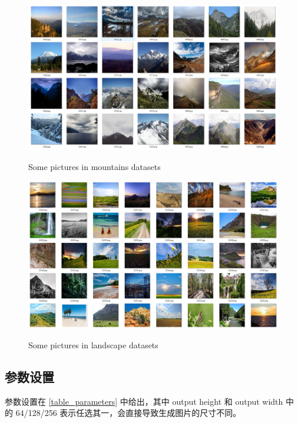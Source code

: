 \documentclass{article}
\begin{document}
\begin{CJK*}{UTF8}{gbsn}
	\begin{figure}[htbp]
		\begin{minipage}{0.5\linewidth}
			\label{fig_mountains}
			\centering\includegraphics[scale=0.22]{res/mountain_datasets.png}
			\caption{Some pictures in mountains datasets}
		\end{minipage}
		\begin{minipage}{0.5\linewidth}
			\label{fig_landscape}
			\centering\includegraphics[scale=0.15]{res/landscape.png}
			\caption{Some pictures in landscape datasets}
		\end{minipage}
	\end{figure}
	
	
  \subsection{参数设置}
    
    参数设置在 \ref{table_parameters} 中给出，其中 output height 和 output width 中的 64/128/256 表示任选其一，会直接导致生成图片的尺寸不同。
    

\end{CJK*}
\end{document}
